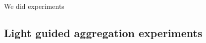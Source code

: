 We did experiments


\subsection{Light guided aggregation experiments}
\label{sec:mblocksExperimentsLight}

